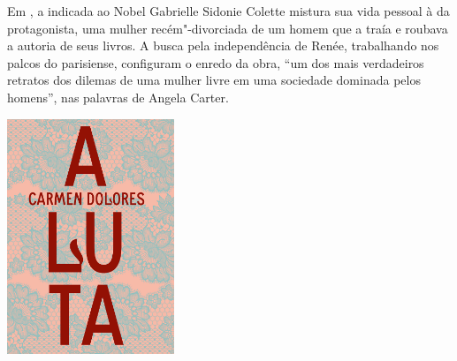 \hspace*{-7cm}\hrulefill\hspace*{-7cm}

\medskip

\noindent{}Em {}, a indicada ao Nobel Gabrielle Sidonie Colette mistura sua vida pessoal à da protagonista, uma mulher recém"-divorciada de um homem que a traía e roubava a autoria de seus livros. A busca pela independência de Renée, trabalhando nos palcos do {} parisiense, configuram o enredo da obra, “um dos mais verdadeiros retratos dos dilemas de uma mulher livre em uma sociedade dominada pelos homens”, nas palavras de Angela Carter.

\vfill

\hspace*{-.4cm}\begin{minipage}[c]{1\linewidth}
\small{
{}}
\end{minipage}

\pagebreak

\hspace{.5cm}

\begin{center}
\hspace*{-.5cm}\includegraphics[width=50mm]{./imgs/luta.jpg}
\end{center}

